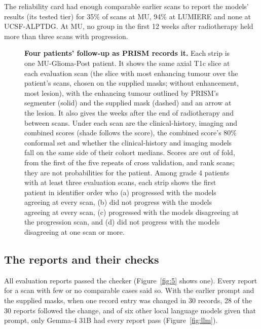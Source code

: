\documentclass[largeformat]{interact} %
\begin{document}
The reliability card had enough comparable earlier scans to report the models' results (its tested tier) for 35\%
of scans at MU, 94\% at LUMIERE and none at UCSF-ALPTDG. At MU, no group in the first 12 weeks after radiotherapy held
more than three scans with progression.

\begin{figure}[!htbp]
\centering
{}
\caption{\textbf{Four patients' follow-up as PRISM records it.} Each strip is one MU-Glioma-Post patient. It shows the
same axial T1c slice at each evaluation scan (the slice with most enhancing tumour over the patient's scans, chosen on the supplied masks; without
enhancement, most lesion), with the enhancing tumour outlined by PRISM's segmenter (solid) and the supplied mask
(dashed) and an arrow at the lesion. It also gives the weeks after the end of radiotherapy and between scans. Under
each scan are the clinical-history, imaging and combined scores (shade follows the score), the combined score's 80\%
conformal set and whether the clinical-history and imaging models fall on the same side of
their cohort medians. Scores are out of fold, from the first of the five repeats of cross validation, and rank scans;
they are not probabilities for the patient. Among grade 4 patients with at least three evaluation scans, each strip
shows the first patient in identifier order who (a) progressed with the models agreeing at every scan, (b) did not
progress with the models agreeing at every scan, (c) progressed with the models disagreeing at the progression scan,
and (d) did not progress with the models disagreeing at one scan or more.}
\label{fig:cases}
\end{figure}

\subsection{The reports and their checks}\label{sec:3.5}

All evaluation reports passed the checker (Figure~\ref{fig:5} shows one). Every report for a scan with few or no comparable
cases said so. With the earlier prompt and the supplied masks, when one record entry was changed in 30 records, 28 of the
30 reports followed the change, and of six other local language models given that prompt, only Gemma-4 31B \citep{gemma2026} had every report pass (Figure~\ref{fig:llm}).
\end{document}
